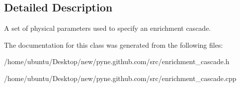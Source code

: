 \subsection{Detailed Description}
A set of physical parameters used to specify an enrichment cascade. 

The documentation for this class was generated from the following files\+:\begin{DoxyCompactItemize}
\item 
/home/ubuntu/\+Desktop/new/pyne.\+github.\+com/src/enrichment\+\_\+cascade.\+h\item 
/home/ubuntu/\+Desktop/new/pyne.\+github.\+com/src/enrichment\+\_\+cascade.\+cpp\end{DoxyCompactItemize}
